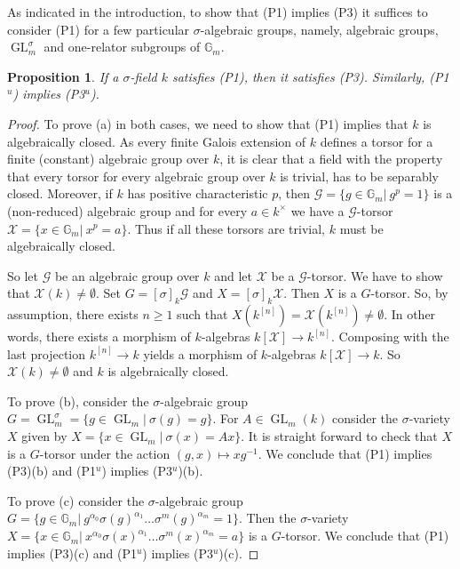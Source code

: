 \documentclass[oneside,reqno]{amsart}
\newtheorem{prop}[theo]{Proposition}
\theoremstyle{definition}
\newcommand{\G}{\mathcal{G}}
\newcommand{\Gl}{\operatorname{GL}}
\newcommand{\Hom}{\operatorname{Hom}}
\newcommand{\X}{\mathcal{X}}
\newcommand{\s}{\sigma}
\newcommand{\ks}{$k$\=/$\s$}
\newcommand{\Gm}{\mathbb{G}_m}
\newcommand{\kn}{k^{[n]}}
\newcommand{\po}{{\rm{(P1$^u$)}}}
\newcommand{\pt}{{\rm{(P3$^u$)}}}
\newcommand{\poweak}{{\rm{(P1)}}}
\newcommand{\ptweak}{{\rm{(P3)}}}
\begin{document}
As indicated in the introduction, to show that \poweak{} implies \ptweak{} it suffices to consider \poweak{} for a few particular $\s$-algebraic groups, namely, algebraic groups, $\Gl_m^\s$ and one-relator subgroups of $\Gm$.


\begin{prop} \label{prop: po implies pt}
	If a $\s$-field $k$ satisfies \poweak{}, then it satisfies \ptweak{}. Similarly, \po{} implies \pt{}.
\end{prop}
\begin{proof}
	To prove (a) in both cases, we need to show that \poweak{} implies that $k$ is algebraically closed. As every finite Galois extension of $k$ defines a torsor for a finite (constant) algebraic group over $k$, it is clear that a field with the property that every torsor for every algebraic group over $k$ is trivial, has to be separably closed.
	Moreover, if $k$ has positive characteristic $p$, then $\G=\{g\in\Gm|\ g^p=1\}$ is a (non-reduced) algebraic group and for every $a\in k^\times$ we have a $\G$-torsor $\X=\{x\in\Gm|\ x^p=a\}$. Thus if all these torsors are trivial, $k$ must be algebraically closed.
	
	So let $\G$ be an algebraic group over $k$ and let $\X$ be a $\G$-torsor. We have to show that $\X(k)\neq\emptyset$.
	Set $G=[\s]_k\G$ and $X=[\s]_k\X$. Then $X$ is a $G$-torsor. So, by assumption, there exists $n\geq 1$ such that $X(\kn)=\X(\kn)\neq\emptyset$. In other words, there exists a morphism of $k$-algebras $k[\X]\to\kn$. Composing with the last projection $\kn\to k$ yields a morphism of $k$-algebras $k[\X]\to k$. So $\X(k)\neq\emptyset$ and $k$ is algebraically closed.
	
	To prove (b), consider the $\s$-algebraic group $G=\Gl_m^\s=\{g\in\Gl_m|\ \s(g)=g\}$.
	For $A\in\Gl_m(k)$ consider the $\s$-variety $X$ given by
	$X=\{x\in\Gl_m|\ \s(x)=Ax\}$. It is straight forward to check that $X$ is a $G$-torsor under the action $(g,x)\mapsto xg^{-1}$. We conclude that \poweak{} implies \ptweak{}(b) and \po{} implies \pt{}(b). 		
	
	To prove (c) consider the $\s$-algebraic group
	$G=\{g\in \Gm |\ g^{\alpha_0}\s(g)^{\alpha_1}\ldots\s^m(g)^{\alpha_m}=1\}.$
	Then the $\s$-variety
	$X=\{x\in \Gm |\ x^{\alpha_0}\s(x)^{\alpha_1}\ldots\s^m(x)^{\alpha_m}=a\}$
	is a $G$-torsor. We conclude that \poweak{} implies \ptweak{}(c) and \po{} implies \pt{}(c). 		
\end{proof}
\end{document}
